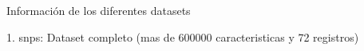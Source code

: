 Información de los diferentes datasets

1. snps: Dataset completo (mas de 600000 caracteristicas y 72 registros)
